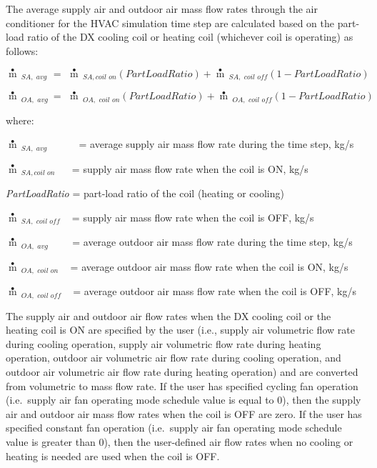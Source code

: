 The average supply air and outdoor air mass flow rates through the air conditioner for the HVAC simulation time step are calculated based on the part-load ratio of the DX cooling coil or heating coil (whichever coil is operating) as follows:

\begin{equation}
\mathop m\limits^ \bullet  {\,_{SA,\,\,avg}}\,\, = \,\,\mathop m\limits^ \bullet  {\,_{SA,coil\,\,on}}\left( {PartLoadRatio} \right) + \mathop m\limits^ \bullet  {\,_{SA,\,\,coil\,\,off}}\left( {1 - PartLoadRatio} \right)
\end{equation}

\begin{equation}
\mathop m\limits^ \bullet  {\,_{OA,\,\,avg\,\,}} = \,\,\mathop m\limits^ \bullet  {\,_{OA,\,\,coil\,\,on}}\left( {PartLoadRatio} \right) + \mathop m\limits^ \bullet  {\,_{OA,\,\,coil\,\,off}}\left( {1 - PartLoadRatio} \right)
\end{equation}

where:

\(\mathop m\limits^ \bullet {\,_{SA,\,\,avg}}\) ~~~~~ = average supply air mass flow rate during the time step, kg/s

\(\mathop m\limits^ \bullet {\,_{SA,coil\,\,on}}\) ~~ = supply air mass flow rate when the coil is ON, kg/s

\emph{PartLoadRatio} = part-load ratio of the coil (heating or cooling)

\(\mathop m\limits^ \bullet {\,_{SA,\,\,coil\,\,off}}\) ~ = supply air mass flow rate when the coil is OFF, kg/s

\(\mathop m\limits^ \bullet {\,_{OA,\,\,avg\,\,}}\) ~~~ = average outdoor air mass flow rate during the time step, kg/s

\(\mathop m\limits^ \bullet {\,_{OA,\,\,coil\,\,on}}\) ~ = average outdoor air mass flow rate when the coil is ON, kg/s

\(\mathop m\limits^ \bullet {\,_{OA,\,\,coil\,\,off}}\) ~ = average outdoor air mass flow rate when the coil is OFF, kg/s

The supply air and outdoor air flow rates when the DX cooling coil or the heating coil is ON are specified by the user (i.e., supply air volumetric flow rate during cooling operation, supply air volumetric flow rate during heating operation, outdoor air volumetric air flow rate during cooling operation, and outdoor air volumetric air flow rate during heating operation) and are converted from volumetric to mass flow rate. If the user has specified cycling fan operation (i.e.~supply air fan operating mode schedule value is equal to 0), then the supply air and outdoor air mass flow rates when the coil is OFF are zero. If the user has specified constant fan operation (i.e.~supply air fan operating mode schedule value is greater than 0), then the user-defined air flow rates when no cooling or heating is needed are used when the coil is OFF.

